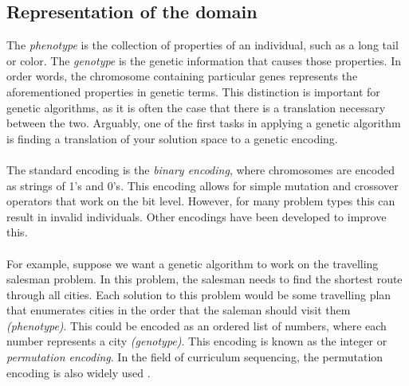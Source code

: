 \subsection{Representation of the domain}
The \emph{phenotype} is the collection of properties of an individual, such as
a long tail or color. The \emph{genotype} is the genetic information that
causes those properties. In order words, the chromosome containing particular
genes represents the aforementioned properties in genetic terms. This
distinction is important for genetic algorithms, as it is often the case that
there is a translation necessary between the two. Arguably, one of the first
tasks in applying a genetic algorithm is finding a translation of your
solution space to a genetic encoding.\\\\
\noindent
The standard encoding is the \emph{binary encoding}, where chromosomes are encoded as
strings of 1's and 0's. This encoding allows for simple mutation and crossover
operators that work on the bit level. However, for many problem types this can
result in invalid individuals. Other encodings have been developed to improve
this.\\\\
\noindent
For example, suppose we want a genetic algorithm to work on the travelling
salesman problem. In this problem, the salesman needs to find the shortest
route through all cities. Each solution to this problem would be some
travelling plan that enumerates cities in the order that the saleman should
visit them \textit{(phenotype)}. This could be encoded as an ordered list of
numbers, where each number represents a city \textit{(genotype)}. This encoding
is known as the integer or \emph{permutation encoding}. In the field of
curriculum sequencing, the permutation encoding is also widely used
\citep{AlMuhaideb2011}.
